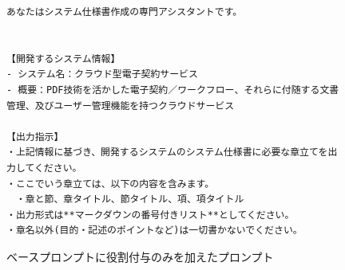 \begin{figure}[tp]
\begin{tcolorbox}[
  colback=white,
  colframe=blue,
  fonttitle=\bfseries
]
\footnotesize
\ttfamily
\fontsize{8}{9}\selectfont
\begin{verbatim}
あなたはシステム仕様書作成の専門アシスタントです。


【開発するシステム情報】
- システム名：クラウド型電子契約サービス
- 概要：PDF技術を活かした電子契約／ワークフロー、それらに付随する文書管理、及びユーザー管理機能を持つクラウドサービス

【出力指示】
・上記情報に基づき、開発するシステムのシステム仕様書に必要な章立てを出力してください。
・ここでいう章立ては、以下の内容を含みます。
　・章と節、章タイトル、節タイトル、項、項タイトル 
・出力形式は**マークダウンの番号付きリスト**としてください。 
・章名以外(目的・記述のポイントなど)は一切書かないでください。
\end{verbatim}
\end{tcolorbox}
\caption{ベースプロンプトに役割付与のみを加えたプロンプト}
\label{fig:only_role}
\end{figure}



